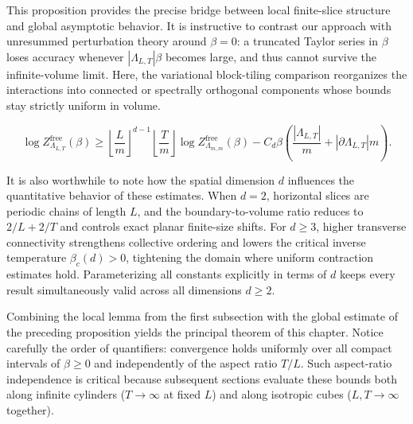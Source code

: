 \documentclass[11pt]{article}
\theoremstyle{definition}
\begin{document}
This proposition provides the precise bridge between local finite-slice structure
and global asymptotic behavior. It is instructive to contrast our approach with
unresummed perturbation theory around $\beta = 0$: a truncated Taylor series in
$\beta$ loses accuracy whenever $|\Lambda_{L,T}| \beta$ becomes large, and thus
cannot survive the infinite-volume limit. Here, the variational block-tiling
comparison reorganizes the interactions into connected or spectrally orthogonal
components whose bounds stay strictly uniform in volume.

\[
  \log Z_{\Lambda_{L,T}}^{\mathrm{free}}(\beta) \ge \left\lfloor \frac{L}{m} \right\rfloor^{d-1} \left\lfloor \frac{T}{m} \right\rfloor \log Z_{\Lambda_{m,m}}^{\mathrm{free}}(\beta) - C_d \beta \left(\frac{|\Lambda_{L,T}|}{m} + |\partial \Lambda_{L,T}| m\right).
\]

It is also worthwhile to note how the spatial dimension $d$ influences the
quantitative behavior of these estimates. When $d = 2$, horizontal slices are
periodic chains of length $L$, and the boundary-to-volume ratio reduces to $2/L +
2/T$ and controls exact planar finite-size shifts. For $d \ge 3$, higher transverse
connectivity strengthens collective ordering and lowers the critical inverse
temperature $\beta_c(d) > 0$, tightening the domain where uniform contraction
estimates hold. Parameterizing all constants explicitly in terms of $d$ keeps every
result simultaneously valid across all dimensions $d \ge 2$.

Combining the local lemma from the first subsection with the global estimate of the
preceding proposition yields the principal theorem of this chapter. Notice carefully
the order of quantifiers: convergence holds uniformly over all compact intervals of
$\beta \ge 0$ and independently of the aspect ratio $T/L$. Such aspect-ratio
independence is critical because subsequent sections evaluate these bounds both
along infinite cylinders ($T \to \infty$ at fixed $L$) and along isotropic cubes
($L, T \to \infty$ together).
\end{document}
